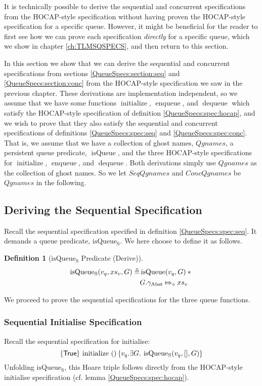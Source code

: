\documentclass[a4paper, 10pt]{report}
\theoremstyle{definition}
\newtheorem{definition}{Definition}[section]
\newcommand{\initialise}{\operatorname{initialize}}
\newcommand{\enqueue}{\operatorname{enqueue}}
\newcommand{\dequeue}{\operatorname{dequeue}}
\newcommand{\isqueue}{\operatorname{isQueue}}
\newcommand{\isqueueseq}{\operatorname{isQueue_{S}}}
\newcommand{\SeqQgnames}{SeqQgnames}
\newcommand{\ConcQgnames}{ConcQgnames}
\newcommand{\Qgnames}{Qgnames}
\newcommand{\vq}{v_q}
\newcommand{\absvalueList}{xs_v}
\newcommand{\Qg}{G}
\newcommand{\gabst}{\gname_{\mathrm{Abst}}}
\newcommand{\abstractstatefullfrag}[2]{#1 \Mapsto_{\circ} #2}
\newcommand{\seqspecinitHTGen}[2]{\hoare{\TRUE}{\initialise \ \TT}{#1 . \Exists #2. \isqueueseq(#1, [], #2)}}
\newcommand{\seqspecinitGen}[2]{\seqspecinitHTGen{#1}{#2}}
\newcommand{\seqspecinit}{\seqspecinitGen{\vq}{\Qg}}
\begin{document}
It is technically possible to derive the sequential and concurrent specifications from the HOCAP-style specification without having proven the HOCAP-style specification for a specific queue. However, it might be beneficial for the reader to first see how we can prove each specification \textit{directly} for a specific queue, which we show in chapter \ref{ch:TLMSQSPECS}, and then return to this section.


In this section we show that we can derive the sequential and concurrent specifications from sections \ref{QueueSpecs:section:seq} and \ref{QueueSpecs:section:conc} from the HOCAP-style specification we saw in the previous chapter. These derivations are implementation independent, so we assume that we have some functions $\initialise$, $\enqueue$, and $\dequeue$ which satisfy the HOCAP-style specification of definition \ref{QueueSpecs:spec:hocap}, and we wish to prove that they also satisfy the sequential and concurrent specifications of definitions \ref{QueueSpecs:spec:seq} and \ref{QueueSpecs:spec:conc}. That is, we assume that we have a collection of ghost names, $\Qgnames$, a persistent queue predicate, $\isqueue$, and the three HOCAP-style specifications for $\initialise$, $\enqueue$, and $\dequeue$. Both derivations simply use $\Qgnames$ as the collection of ghost names. So we let $\SeqQgnames$ and $\ConcQgnames$ be $\Qgnames$ in the following.

\subsection{Deriving the Sequential Specification}
Recall the sequential specification specified in definition \ref{QueueSpecs:spec:seq}. It demands a queue predicate, $\isqueueseq$. We here choose to define it as follows.
\begin{definition}[$\isqueueseq$ Predicate (Derive)]\label{QueueSpecs:spec:seq:isqueueseq_derive}
\begin{align*}
  \isqueueseq(\vq, \absvalueList, \Qg) \eqdef
    &\isqueue(\vq, \Qg) \star{}\\
    &\abstractstatefullfrag{\Qg.\gabst}{\absvalueList}
\end{align*}
\end{definition}
We proceed to prove the sequential specifications for the three queue functions.

\subsubsection{Sequential Initialise Specification}
Recall the sequential specification for initialise:
\begin{equation*}
  \seqspecinit
\end{equation*}
Unfolding $\isqueueseq$, this Hoare triple follows directly from the HOCAP-style initialise specification (cf. lemma \ref{QueueSpecs:spec:hocap}).
\end{document}
